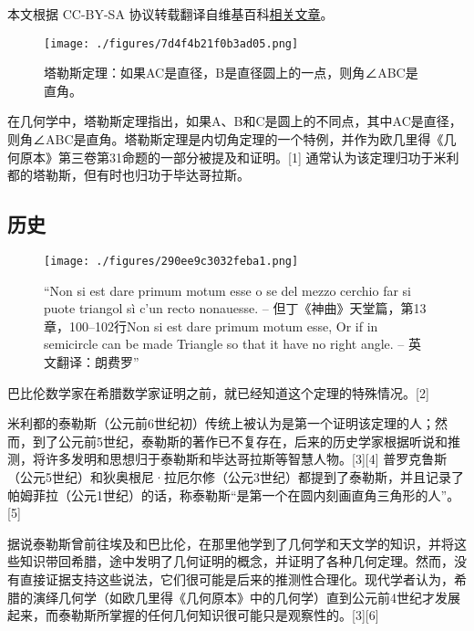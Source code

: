 
本文根据 CC-BY-SA 协议转载翻译自维基百科\href{https://en.wikipedia.org/wiki/Thales\%27s_theorem}{相关文章}。

\begin{figure}[ht]
\centering
\texttt{[image: ./figures/7d4f4b21f0b3ad05.png]}
\caption{塔勒斯定理：如果AC是直径，B是直径圆上的一点，则角∠ABC是直角。} \label{fig_Thales_1}
\end{figure}
在几何学中，塔勒斯定理指出，如果A、B和C是圆上的不同点，其中AC是直径，则角∠ABC是直角。塔勒斯定理是内切角定理的一个特例，并作为欧几里得《几何原本》第三卷第31命题的一部分被提及和证明。[1] 通常认为该定理归功于米利都的塔勒斯，但有时也归功于毕达哥拉斯。
\subsection{历史}
\begin{figure}[ht]
\centering
\texttt{[image: ./figures/290ee9c3032feba1.png]}
\caption{“Non si est dare primum motum esse o se del mezzo cerchio far si puote triangol sì c'un recto nonauesse. – 但丁《神曲》天堂篇，第13章，100–102行Non si est dare primum motum esse, Or if in semicircle can be made Triangle so that it have no right angle. – 英文翻译：朗费罗”} \label{fig_Thales_2}
\end{figure}
巴比伦数学家在希腊数学家证明之前，就已经知道这个定理的特殊情况。[2]

米利都的泰勒斯（公元前6世纪初）传统上被认为是第一个证明该定理的人；然而，到了公元前5世纪，泰勒斯的著作已不复存在，后来的历史学家根据听说和推测，将许多发明和思想归于泰勒斯和毕达哥拉斯等智慧人物。[3][4] 普罗克鲁斯（公元5世纪）和狄奥根尼·拉厄尔修（公元3世纪）都提到了泰勒斯，并且记录了帕姆菲拉（公元1世纪）的话，称泰勒斯“是第一个在圆内刻画直角三角形的人”。[5]

据说泰勒斯曾前往埃及和巴比伦，在那里他学到了几何学和天文学的知识，并将这些知识带回希腊，途中发明了几何证明的概念，并证明了各种几何定理。然而，没有直接证据支持这些说法，它们很可能是后来的推测性合理化。现代学者认为，希腊的演绎几何学（如欧几里得《几何原本》中的几何学）直到公元前4世纪才发展起来，而泰勒斯所掌握的任何几何知识很可能只是观察性的。[3][6]